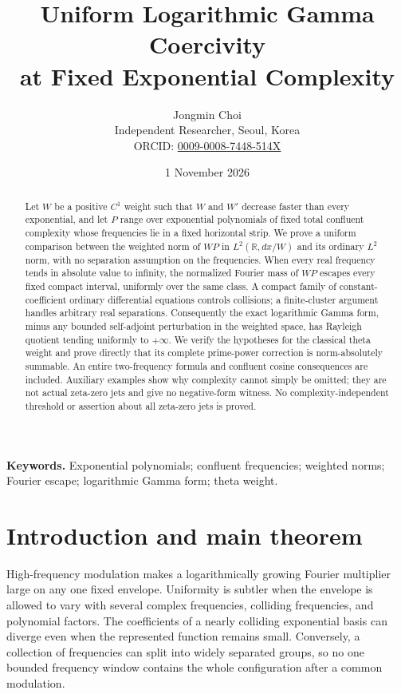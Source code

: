 \documentclass[11pt]{article}
\title{Uniform Logarithmic Gamma Coercivity\\at Fixed Exponential Complexity}
\author{Jongmin Choi\\[3pt]
\small Independent Researcher, Seoul, Korea\\
\small ORCID: \href{https://orcid.org/0009-0008-7448-514X}{0009-0008-7448-514X}}
\date{1 November 2026}
\theoremstyle{definition}
\theoremstyle{remark}
\newcommand{\R}{\mathbb R}
\begin{document}
\maketitle
\begin{abstract}
Let $W$ be a positive $C^1$ weight such that $W$ and $W'$
decrease faster than every exponential, and let
$P$ range over exponential polynomials of fixed total confluent complexity
whose frequencies lie in a fixed horizontal strip. We prove a uniform
comparison between the weighted norm of $WP$ in $L^2(\R,dx/W)$ and its
ordinary $L^2$ norm, with no separation assumption on the frequencies.
When every real frequency tends in absolute value to infinity, the
normalized Fourier mass of $WP$ escapes every fixed compact interval,
uniformly over the same class. A compact family of constant-coefficient
ordinary differential equations controls collisions; a finite-cluster
argument handles arbitrary real separations. Consequently the exact
logarithmic Gamma form, minus any bounded self-adjoint perturbation in the
weighted space, has Rayleigh quotient tending uniformly to $+\infty$.
We verify the hypotheses for the classical theta weight and prove directly
that its complete prime-power correction is norm-absolutely summable.
An entire two-frequency formula and confluent cosine consequences are
included. Auxiliary examples show why complexity cannot simply be omitted;
they are not actual zeta-zero jets and give no negative-form witness.
No complexity-independent threshold or assertion about all zeta-zero jets
is proved.
\end{abstract}
\noindent\textbf{Keywords.} Exponential polynomials; confluent frequencies; weighted norms;
Fourier escape; logarithmic Gamma form; theta weight.

\section{Introduction and main theorem}

High-frequency modulation makes a logarithmically growing Fourier
multiplier large on any one fixed envelope. Uniformity is subtler when the
envelope is allowed to vary with several complex frequencies, colliding
frequencies, and polynomial factors. The coefficients of a nearly
colliding exponential basis can diverge even when the represented function
remains small. Conversely, a collection of frequencies can split into
widely separated groups, so no one bounded frequency window contains the
whole configuration after a common modulation.
\end{document}

